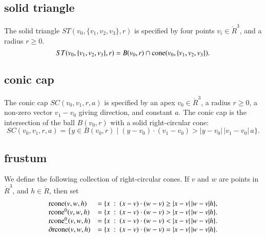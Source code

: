 \subsection{solid triangle}

\begin{definition} The solid triangle $ST(v_0,\{v_1,v_2,v_3\},r)$ is
specified by four points $v_i\in\ring{R}^3$, and a radius $r\ge0$. 
    $$
    ST(v_0,\{v_1,v_2,v_3\},r) = 
    B(v_0,r)\cap {\operatorname{cone}}(v_0,\{v_1,v_2,v_3\}).
    $$
\end{definition}



\subsection{conic cap}


\begin{definition}
The conic cap $SC(v_0,v_1,r,a)$ is specified by an apex
$v_0\in\ring{R}^3$, a radius $r\ge0$, a non-zero vector $v_1-v_0$ giving
direction, and constant $a$.  The conic cap is the intersection of
the ball $B(v_0,r)$ with a solid right-circular cone:
    $$
    SC(v_0,v_1,r,a)=\{y \in B(v_0,r) \mid (y-v_0)\cdot (v_1-v_0) > |y-v_0|\, |v_1-v_0|\, a\}.
    $$
\end{definition}

\subsection{frustum}

\begin{definition}
We define the following collection of right-circular cones.
If $v$ and $w$ are points in $\ring{R}^3$, and
  $h\in\ring{R}$, then set
  $$\begin{array}{lll}
    {\operatorname{rcone}}(v,w,h) &= \{x\ :\  (x-v)\cdot (w-v) \ge |x-v|\,|w-v| h\},\\
    {\operatorname{rcone}}^0(v,w,h) &= \{x\ :\  (x-v)\cdot (w-v) > |x-v|\,|w-v| h\}.\\
    {\operatorname{rcone}}_-^0(v,w,h) &= \{x\ :\  (x-v)\cdot (w-v) < |x-v|\,|w-v| h\}.\\
    \partial{\operatorname{rcone}}(v,w,h) &= \{x\ :\  (x-v)\cdot (w-v) = |x-v|\,|w-v| h\}.\\
    \end{array}
    $$
\end{definition}



